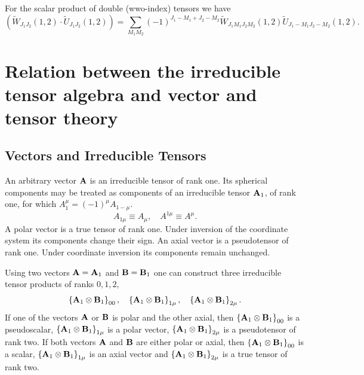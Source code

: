 For the scalar product of double (wwo-index) tensors we have
\begin{equation}
\left(\widetilde{W}_{J_{1} J_{2}}(1,2) \cdot \widetilde{U}_{J_{1} J_{2}}(1,2)\right)=\sum_{M_{1} M_{2}}(-1)^{J_{1}-M_{1}+J_{2}-M_{2}} \widetilde{W}_{J_{1} M_{1} J_{2} M_{2}}(1,2) \widetilde{U}_{J_{1}-M_{1} J_{2}-M_{2}}(1,2) . \label{eq:3:1:35}
\end{equation}
\section{Relation between the irreducible tensor algebra and vector and tensor theory}\label{sec:3.2}
\subsection{Vectors and Irreducible Tensors}\label{sec:3.2.1}
An arbitrary vector $\mathbf{A}$ is an irreducible tensor of rank one. Its spherical components may be treated as components of an irreducible tensor $\mathbf{A}_{1}$, of rank one, for which $A_{1}^{\mu}=(-1)^{\mu} A_{1-\mu}$.
\begin{equation}
A_{1 \mu} \equiv A_{\mu}, \quad A^{1 \mu} \equiv A^{\mu}. \label{eq:3:2:1}
\end{equation}
A polar vector is a true tensor of rank one. Under inversion of the coordinate system its components change their sign. An axial vector is a pseudotensor of rank one. Under coordinate inversion its components remain unchanged.

Using two vectors $\mathbf{A}=\mathbf{A}_{1}$ and $\mathbf{B}=\mathbf{B}_{1}$ one can construct three irreducible tensor products of ranks $0,1,2$,
\[
\left\{\mathbf{A}_{1} \otimes \mathbf{B}_{1}\right\}_{00}, \quad\left\{\mathbf{A}_{1} \otimes \mathbf{B}_{1}\right\}_{1 \mu}, \quad\left\{\mathbf{A}_{1} \otimes \mathbf{B}_{1}\right\}_{2 \mu} .
\]
If one of the vectors $\mathbf{A}$ or $\mathbf{B}$ is polar and the other axial, then $\left\{\mathbf{A}_{1} \otimes \mathbf{B}_{1}\right\}_{00}$ is a pseudoscalar, $\left\{\mathbf{A}_{1} \otimes \mathbf{B}_{1}\right\}_{1 \mu}$ is a polar vector, $\left\{\mathbf{A}_{1} \otimes \mathbf{B}_{1}\right\}_{2 \mu}$ is a pseudotensor of rank two. If both vectors $\mathbf{A}$ and $\mathbf{B}$ are either polar or axial, then $\left\{\mathbf{A}_{1} \otimes \mathbf{B}_{1}\right\}_{00}$ is a scalar, $\left\{\mathbf{A}_{1} \otimes \mathbf{B}_{1}\right\}_{1 \mu}$ is an axial vector and $\left\{\mathbf{A}_{1} \otimes \mathbf{B}_{1}\right\}_{2 \mu}$ is a true tensor of rank two.

